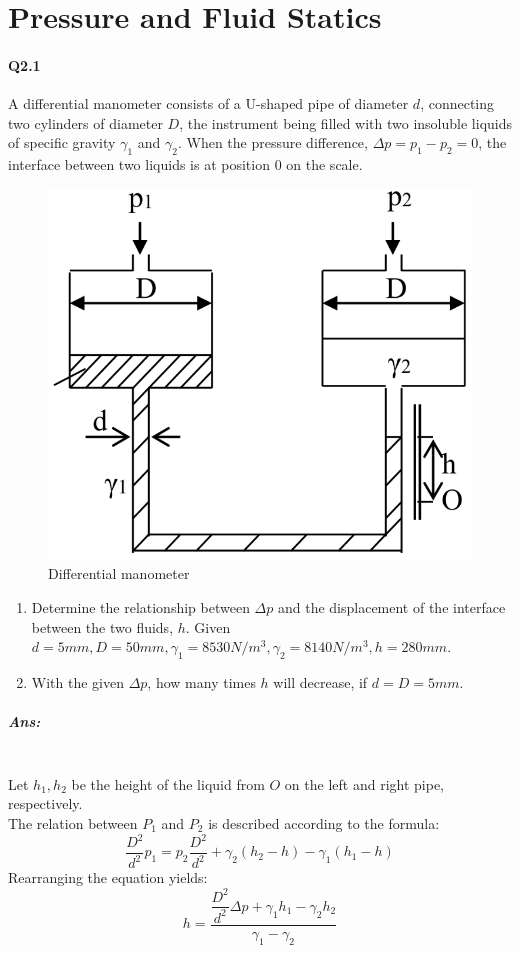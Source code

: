 \chapter{Pressure and Fluid Statics}%

\subsubsection{Q2.1}
A differential manometer consists of a U-shaped pipe of diameter $ d $, connecting two cylinders of diameter $ D $, the  instrument being filled with two insoluble liquids of specific gravity $ \gamma_1 $ and $ \gamma_2  $. When the pressure difference, $ \Delta p = p_1-p_2 =0$, the interface between two liquids is at position $ 0 $ on the scale.
\begin{figure}[h]
	\centering
	\includegraphics[width=0.4\linewidth]{"2020-08-13 17.00.35 drive.google.com c4c67da5f09f"}
	\caption{Differential manometer}
	\label{fig:2020-08-13-17}
\end{figure}
\begin{enumerate}
	\item Determine the relationship between $ \Delta p $ and the displacement of the interface between the two fluids, $ h $. Given $ d=5\unit{mm},D=50\unit{mm}, \gamma_1=8530\unit{N/m^3},\gamma_2=8140\unit{N/m^3}, h=280\unit{mm}$.
	\item With the given $ \Delta p $, how many times $ h $ will decrease, if $ d=D=5\unit{mm} $.
\end{enumerate}
\paragraph{Ans:}$  $\\
Let $ h_1,h_2 $ be the height of the liquid from $ O $ on the left and right pipe, respectively.\\
The relation between $ P_1 $ and $ P_2 $ is described according to the formula:
\[\dfrac{D^2}{d^2}p_1=p_2\dfrac{D^2}{d^2}+\gamma_2(h_2-h)-\gamma_1(h_1-h)\]
Rearranging the equation yields:
\[h=\dfrac{\dfrac{D^2}{d^2}\Delta p +\gamma_1h_1-\gamma_2h_2}{\gamma_1-\gamma_2}\]

